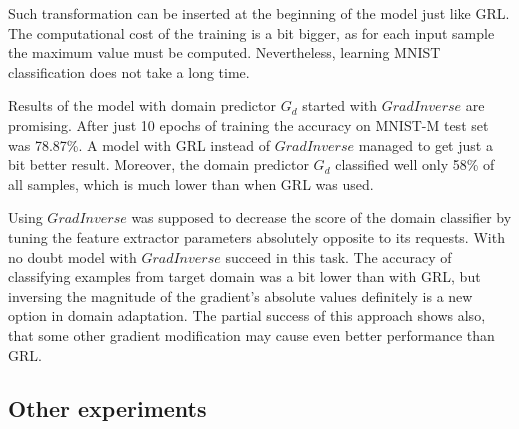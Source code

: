 \documentclass{article}
\begin{document}
Such transformation can be inserted at the beginning of the model just like GRL. The computational cost of the training is a bit bigger, as for each input sample the maximum value must be computed. Nevertheless, learning MNIST classification does not take a long time.
\par
Results of the model with domain predictor $G_{d}$ started with $GradInverse$ are promising. 
After just 10 epochs of training the accuracy on MNIST-M test set was 78.87\%. A model with GRL instead of $GradInverse$ managed to get just a bit better result. Moreover, the domain predictor $G_{d}$ classified well only 58\% of all samples, which is much lower than when GRL was used.
\par
Using $GradInverse$ was supposed to decrease the score of the domain classifier by tuning the feature extractor parameters absolutely opposite to its requests. With no doubt model with $GradInverse$ succeed in this task. The accuracy of classifying examples from target domain was a bit lower than with GRL, but inversing the magnitude of the gradient's absolute values definitely is a new option in domain adaptation. The partial success of this approach shows also, that some other gradient modification may cause even better performance than GRL.

\subsection{Other experiments}
\end{document}
